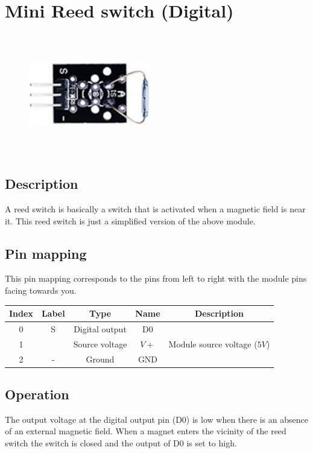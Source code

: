 \section{Mini Reed switch (Digital)}
\begin{figure}[H]
    \centering
    \includegraphics[angle=0, keepaspectratio=true, scale=1, width=200px, height=200px]{images/reed_digital.jpg}
\end{figure}
\subsection*{Description}
A reed switch is basically a switch that is activated when a magnetic field is near it. This reed switch is just a simplified version of the above module.
\subsection*{Pin mapping}
This pin mapping corresponds to the pins from left to right with the module pins facing towards you.
\begin{table}[H]
    \centering
    \begin{tabular}{|c|c|c|c|c|}
    \hline
    Index &Label &Type &Name &Description\\ \hline
    0 &S &Digital output &D0 &\\ \hline
    1 & &Source voltage &$V+$ &Module source voltage ($5V$)\\ \hline
    2 &- &Ground &GND &\\ \hline
    \end{tabular}
\end{table}
\subsection*{Operation}
The output voltage at the digital output pin (D0) is low when there is an absence of an external magnetic field. When a magnet enters the vicinity of the reed switch the switch is closed and the output of D0 is set to high.
%